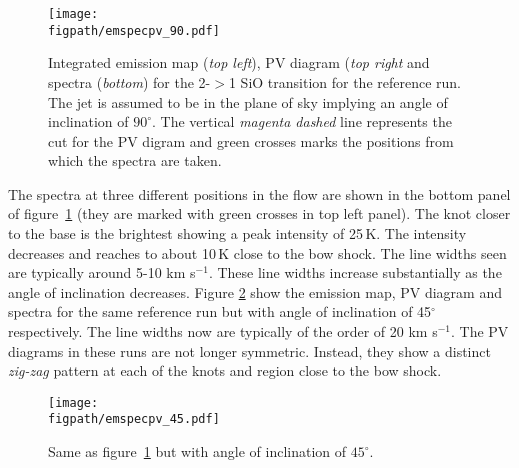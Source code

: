 \documentclass[useAMS,usenatbib]{mn2e}
\newcommand{\figpath}{/Users/bhargavvaidya/MyProject/work/Leeds_Uni/SiOJets_New/PAPER/PFIGS/}
\begin{document}
\begin{figure}
 \texttt{[image: \\figpath/emspecpv\_90.pdf]}%
 \caption{Integrated emission map ({\it top left}), PV diagram ({\it top right}
   and spectra ({\it bottom}) for the
   2-$>$1 SiO transition for the reference run. 
   The jet is assumed to be in the plane of sky implying an angle of
   inclination of $90^{\circ}$. The vertical {\it magenta dashed} line
   represents the cut for the PV digram and green crosses marks the positions from which the spectra are taken.} 
\label{empvspec90}
\end{figure}

The spectra at three different positions in the flow are shown in the
bottom panel of figure~\ref{empvspec90} (they are marked with green
crosses in top left panel). The knot closer to the base is the brightest
showing a peak intensity of 25\,K. The
intensity decreases and reaches to about 10\,K close to the bow shock.
The line widths seen are typically around 5-10 km s$^{-1}$.
These line widths increase substantially as the angle of inclination
decreases. Figure \ref{empvspec45} show the
emission map, PV diagram and spectra for the same reference run but
with angle of inclination of 45$^{\circ}$
respectively. The line 
widths now are typically of the order of 20 km s$^{-1}$. 
The PV diagrams in these runs are not longer symmetric. Instead, they show a distinct {\it zig-zag}
pattern at each of the knots and region close to the bow shock.



\begin{figure}
 \texttt{[image: \\figpath/emspecpv\_45.pdf]}%
 \caption{Same as figure~\ref{empvspec90} but with angle of
   inclination of $45^{\circ}$.} 
\label{empvspec45}
\end{figure}

\end{document}
